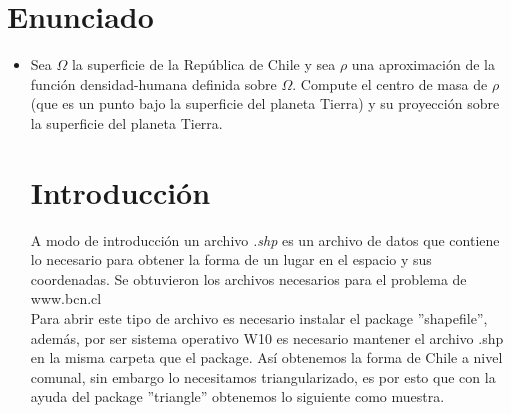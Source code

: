 \documentclass[20pt]{report}
\begin{document}
\section{Enunciado}
\begin{itemize}
\item Sea $\Omega$ la superficie de la Rep\'ublica de Chile y sea $\rho$ una aproximaci\'on de la funci\'on densidad-humana definida sobre $\Omega$. Compute el centro de masa de $\rho$ (que es un punto bajo la superficie del planeta Tierra) y su proyecci\'on sobre la superficie del planeta Tierra.
\\


\begin{figure}[H]
    \centering
\end{figure}
\pagebreak
\label{cap.introduccion}\section{Introducci\'on}

A modo de introducci\'on un archivo \textit{.shp} es un archivo de datos que contiene  lo necesario para obtener la forma de un lugar en el espacio y sus coordenadas. Se obtuvieron los archivos necesarios para el problema de  www.bcn.cl \\
Para abrir este tipo de archivo es necesario instalar el package ''shapefile'', adem\'as, por ser sistema operativo W10 es necesario mantener el archivo .shp en la misma carpeta que el package.
As\'i obtenemos la forma de Chile a nivel comunal, sin embargo lo necesitamos triangularizado, es por esto que con la ayuda del package ''triangle'' obtenemos lo siguiente como muestra.
\begin{figure}[H]
  \scalebox{0.5}{
  
}
\end{figure}
\end{itemize}
\end{document}
